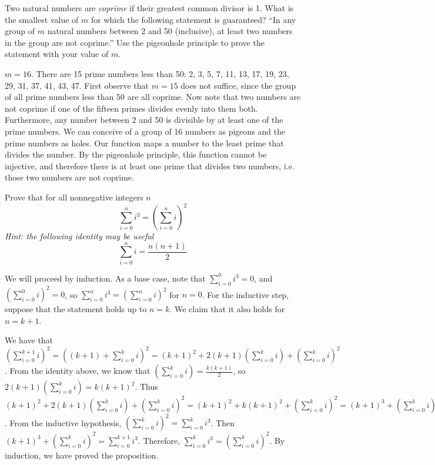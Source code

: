 \documentclass[solution, letterpaper]{cs20}
\begin{document}
Two natural numbers are \textit{coprime} if their greatest common divisor is 1. What is the smallest value of $m$ for which the following statement is guaranteed? ``In any group of $m$ natural numbers between 2 and 50 (inclusive), at least two numbers in the group are not coprime.'' Use the pigeonhole principle to prove the statement with your value of $m$. 

\begin{solution}

$m = 16$. There are 15 prime numbers less than 50: 2, 3, 5, 7, 11, 13, 17, 19, 23, 29, 31, 37, 41, 43, 47. First observe that $m = 15$ does not suffice, since the group of all prime numbers less than 50 are all coprime. Now note that two numbers are not coprime if one of the fifteen primes divides evenly into them both. Furthermore, any number between 2 and 50 is divisible by at least one of the prime numbers. We can conceive of a group of 16 numbers as pigeons and the prime numbers as holes. Our function maps a number to the least prime that divides the number. By the pigeonhole principle, this function cannot be injective, and therefore there is at least one prime that divides two numbers, i.e. those two numbers are not coprime.

\end{solution}


Prove that for all nonnegative integers $n$
\[ \sum_{i=0}^{n}i^{3}=\left( \sum_{i=0}^{n}i \right)^{2} \]
{\em Hint: the following identity may be useful}
\[ \sum_{i=0}^ni=\frac{n(n+1)}{2} \]

\begin{solution}
  
We will proceed by induction. As a base case, note that $\sum_{i=0}^0 i^3 = 0$, and 
$\left( \sum_{i=0}^{0}i \right)^{2} = 0$, so $\sum_{i=0}^{n}i^{3}=\left( \sum_{i=0}^{n}i \right)^{2}$ for $n = 0$. For the inductive step, suppose that the statement holds up to $n = k$. We claim that it also holds for $n = k+1$.

We have that $\left( \sum_{i=0}^{k+1}i \right)^{2} = \left((k+1)+ \sum_{i=0}^{k}i \right)^{2} = (k+1)^2 + 2(k+1)(\sum_{i=0}^{k}i) + (\sum_{i=0}^{k}i)^2$. From the identity above, we know that $(\sum_{i=0}^{k}i) = \frac{k(k+1)}{2}$, so $2(k+1)(\sum_{i=0}^{k}i) = k(k+1)^2$. Thus $(k+1)^2 + 2(k+1)(\sum_{i=0}^{k}i) + (\sum_{i=0}^{k}i)^2 = (k+1)^2 + k(k+1)^2 + (\sum_{i=0}^{k}i)^2 = (k+1)^3 + (\sum_{i=0}^{k}i)^2$. From the inductive hypothesis, $(\sum_{i=0}^{k}i)^2 = \sum_{i=0}^{k}i^{3}$. Then $(k+1)^3 + (\sum_{i=0}^{k}i)^2 = \sum_{i=0}^{k+1}i^{3}$. Therefore, $\sum_{i=0}^{k}i^{3}=\left( \sum_{i=0}^{k}i \right)^{2}$. By induction, we have proved the proposition.  
  
\end{solution}
\end{document}

